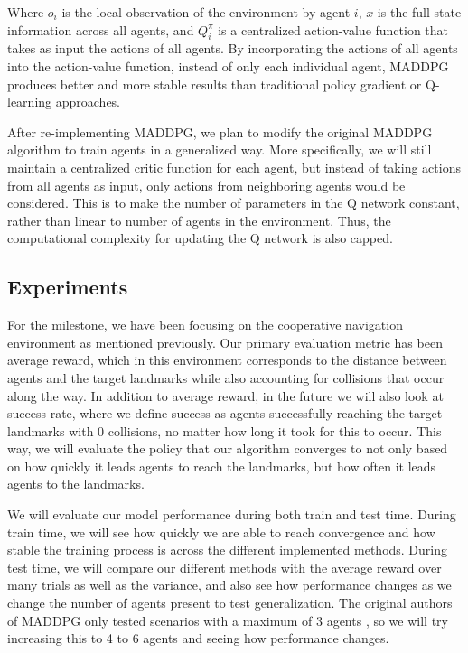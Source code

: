 \documentclass{article}
\begin{document}
Where $o_i$ is the local observation of the environment by agent $i$, $x$ is the full state information across all agents, and $Q^{\pi}_i$ is a centralized action-value function that takes as input the actions of all agents. By incorporating the actions of all agents into the action-value function, instead of only each individual agent, MADDPG produces better and more stable results than traditional policy gradient or Q-learning approaches.

After re-implementing MADDPG, we plan to modify the original MADDPG algorithm to train agents in a generalized way. More specifically, we will still maintain a centralized critic function for each agent, but instead of taking actions from all agents as input, only actions from neighboring agents would be considered. This is to make the number of parameters in the Q network constant, rather than linear to number of agents in the environment. Thus, the computational complexity for updating the Q network is also capped.

\subsection{Experiments}

For the milestone, we have been focusing on the cooperative navigation environment as mentioned previously. Our primary evaluation metric has been average reward, which in this environment corresponds to the distance between agents and the target landmarks while also accounting for collisions that occur along the way. In addition to average reward, in the future we will also look at success rate, where we define success as agents successfully reaching the target landmarks with 0 collisions, no matter how long it took for this to occur. This way, we will evaluate the policy that our algorithm converges to not only based on how quickly it leads agents to reach the landmarks, but how often it leads agents to the landmarks.

We will evaluate our model performance during both train and test time. During train time, we will see how quickly we are able to reach convergence and how stable the training process is across the different implemented methods. During test time, we will compare our different methods with the average reward over many trials as well as the variance, and also see how performance changes as we change the number of agents present to test generalization. The original authors of MADDPG only tested scenarios with a maximum of 3 agents , so we will try increasing this to 4 to 6 agents and seeing how performance changes.
\end{document}
